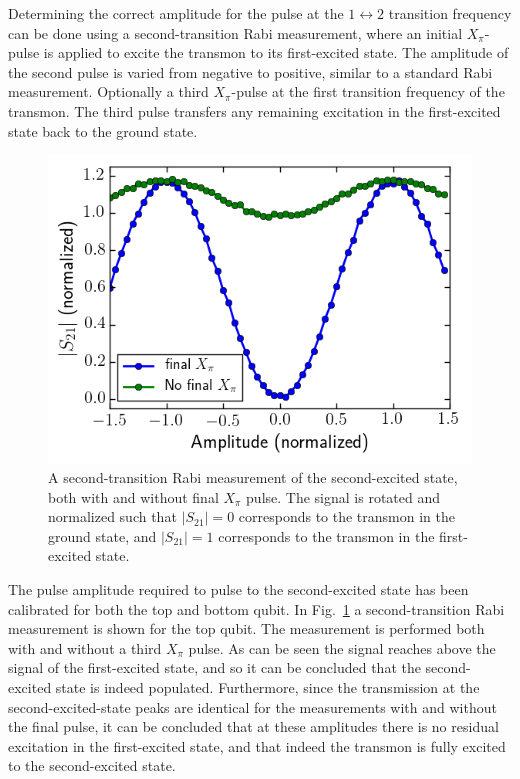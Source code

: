         Determining the correct amplitude for the pulse at the $1 \leftrightarrow 2$ transition frequency can be done using a second-transition Rabi measurement, where an initial $X_\pi$-pulse is applied to excite the transmon to its first-excited state. The amplitude of the second pulse is varied from negative to positive, similar to a standard Rabi measurement. Optionally a third $X_\pi$-pulse at the first transition frequency of the transmon. The third pulse transfers any remaining excitation in the first-excited state back to the ground state.

        \begin{figure}
          \begin{center}
          \vspace{-30pt}
            \includegraphics[width=\textwidth]{Figures/Qubit characterization/Rabi12.png}
          \end{center}
          \vspace{-20 pt}
          \caption{A second-transition Rabi measurement of the second-excited state, both with and without final $X_\pi$ pulse. The signal is rotated and normalized such that $\left|S_{21}\right|=0$ corresponds to the transmon in the ground state, and $\left|S_{21}\right|=1$ corresponds to the transmon in the first-excited state.}
          \label{fig:Rabi12}
        \end{figure}

        The pulse amplitude required to pulse to the second-excited state has been calibrated for both the top and bottom qubit. In Fig.~\ref{fig:Rabi12} a second-transition Rabi measurement is shown for the top qubit. The measurement is performed both with and without a third $X_\pi$ pulse. As can be seen the signal reaches above the signal of the first-excited state, and so it can be concluded that the second-excited state is indeed populated. Furthermore, since the transmission at the second-excited-state peaks are identical for the measurements with and without the final pulse, it can be concluded that at these amplitudes there is no residual excitation in the first-excited state, and that indeed the transmon is fully excited to the second-excited state.


